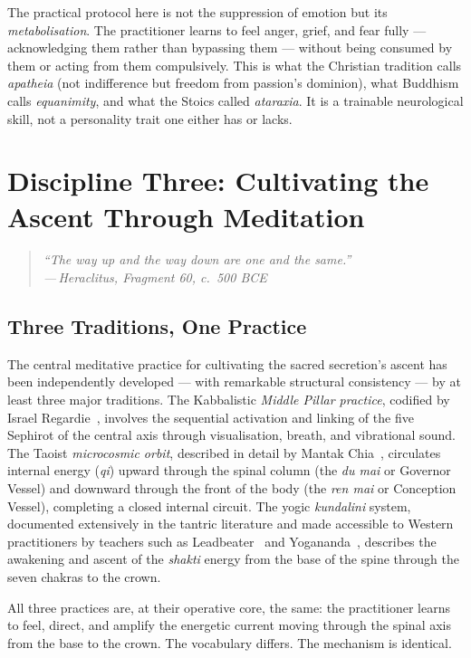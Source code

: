 \documentclass[12pt, a4paper]{article}
\newcommand{\epigraph}[2]{%
  \begin{quote}
    \itshape ``#1''\\[0.3em]
    \normalfont\small\hfill ---\,#2
  \end{quote}
}
\begin{document}
The practical protocol here is not the suppression of emotion but its
\emph{metabolisation}. The practitioner learns to feel anger, grief, and fear
fully — acknowledging them rather than bypassing them — without being consumed
by them or acting from them compulsively. This is what the Christian tradition
calls \emph{apatheia} (not indifference but freedom from passion's dominion),
what Buddhism calls \emph{equanimity}, and what the Stoics called
\emph{ataraxia}. It is a trainable neurological skill, not a personality trait
one either has or lacks.

\section{Discipline Three: Cultivating the Ascent Through Meditation}
\label{sec:meditation}

\epigraph{The way up and the way down are one and the same.}{Heraclitus,
Fragment 60, c.~500 BCE}

\subsection{Three Traditions, One Practice}

The central meditative practice for cultivating the sacred secretion's ascent
has been independently developed — with remarkable structural consistency — by
at least three major traditions. The Kabbalistic \emph{Middle Pillar practice},
codified by Israel Regardie~\autocite{regardie1932}, involves the sequential
activation and linking of the five Sephirot of the central axis through
visualisation, breath, and vibrational sound. The Taoist \emph{microcosmic
orbit}, described in detail by Mantak Chia~\autocite{chia1983}, circulates
internal energy (\emph{qi}) upward through the spinal column (the
\emph{du mai} or Governor Vessel) and downward through the front of the body
(the \emph{ren mai} or Conception Vessel), completing a closed internal
circuit. The yogic \emph{kundalini} system, documented extensively in the
tantric literature and made accessible to Western practitioners by teachers
such as Leadbeater~\autocite{leadbeater1927} and Yogananda~\autocite{yogananda1946},
describes the awakening and ascent of the \emph{shakti} energy from the base
of the spine through the seven chakras to the crown.

All three practices are, at their operative core, the same: the practitioner
learns to feel, direct, and amplify the energetic current moving through the
spinal axis from the base to the crown. The vocabulary differs. The mechanism
is identical.
\end{document}
